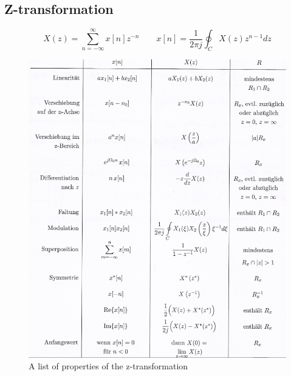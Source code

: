 \documentclass[10pt,a4paper]{article}
\begin{document}
\newpage
\subsection{Z-transformation}
$$
X(z) = \sum_{n=-\infty}^{\infty} x[n] z^{-n} \qquad
x[n] = \frac{1}{2\pi j} \oint_C X(z)z^{n-1} dz
$$
\begin{figure}[H]
\centering
\includegraphics[scale=0.9]{4ZProperties.PNG}
\caption{A list of properties of the z-transformation}
\label{FourierContProperties}
\end{figure}
\end{document}
